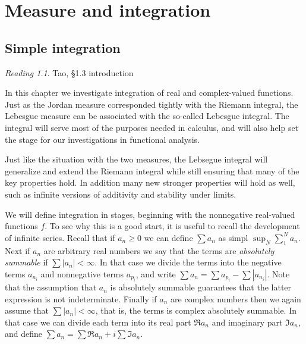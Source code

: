 \documentclass[11pt,oneside]{amsbook}
\theoremstyle{definition}
\theoremstyle{plain}
\theoremstyle{definition}
\theoremstyle{remark}
\newtheorem*{reading}{Reading}
\numberwithin{equation}{section}
\numberwithin{figure}{section}
\begin{document}
\chapter{Measure and integration}

\section{Simple integration}

\begin{reading}
  Tao, \S 1.3 introduction
\end{reading}

In this chapter we investigate integration of real and complex-valued functions. Just as the Jordan measure corresponded tightly with the Riemann integral, the Lebesgue measure can be associated with the so-called Lebesgue integral. The integral will serve most of the purposes needed in calculus, and will also help set the stage for our investigations in functional analysis.

Just like the situation with the two measures, the Lebsegue integral will generalize and extend the Riemann integral while still ensuring that many of the key properties hold. In addition many new stronger properties will hold as well, such as infinite versions of additivity and stability under limits.

We will define integration in stages, beginning with the nonnegative real-valued functions $f$. To see why this is a good start, it is useful to recall the development of infinite series. Recall that if $a_n\geq0$ we can define $\sum a_n$ as simpl $\sup_N\sum_1^Na_n$. Next if $a_n$ are arbitrary real numbers we say that the terms are \emph{absolutely summable} if $\sum|a_n|<\infty$. In that case we divide the terms into the negative terms $a_{n_i}$ and nonnegative terms $a_{p_i}$, and write $\sum a_n=\sum a_{p_i}-\sum|a_{n_i}|$. Note that the assumption that $a_n$ is absolutely summable guarantees that the latter expression is not indeterminate. Finally if $a_n$ are complex numbers then we again assume that $\sum|a_n|<\infty$, that is, the terms is complex absolutely summable. In that case we can divide each term into its real part $\Re a_n$ and imaginary part $\Im a_n$, and define $\sum a_n=\sum\Re a_n+i\sum\Im a_n$.
\end{document}
